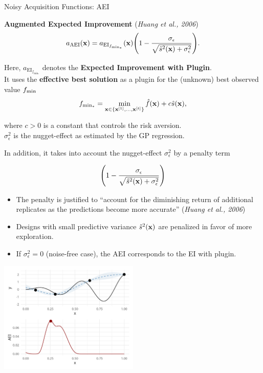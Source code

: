 \documentclass[11pt,compress,t,notes=noshow, xcolor=table]{beamer}
\begin{document}
\begin{vbframe}{Noisy Acquisition Functions: AEI}


\textbf{Augmented Expected Improvement} (\emph{Huang et al., 2006})
$$
  a_{\text{AEI}}(\mathbf{x}) = a_{\text{EI}_{f_{\min_*}}}(\mathbf{x}) \Bigg(1- \frac{\sigma_{\epsilon}}{\sqrt{\hat{s}^2(\mathbf{x})+ \sigma_{\epsilon}^{2}}}\Bigg).
$$

Here, $a_{\text{EI}_{f_{\min_*}}}$ denotes the \textbf{Expected Improvement with Plugin}.\\
It uses the \textbf{effective best solution} as a plugin for the (unknown) best observed value $f_{\min}$
$$
  f_{\min_*} = \min_{\mathbf{x} \in \{\mathbf{x}^{[1]}, ..., \mathbf{x}^{[t]}\}} \hat{f}(\mathbf{x}) + c \hat{s}(\mathbf{x}),
$$

where $c > 0$ is a constant that controls the risk aversion.\\
\vspace{1em}
$\sigma_{\epsilon}^{2}$ is the nugget-effect as estimated by the GP regression.


\framebreak

In addition, it takes into account the nugget-effect $\sigma_{\epsilon}^{2}$ by a penalty term

$$
  \Bigg(1- \frac{\sigma_\epsilon}{\sqrt{\hat{s}^2(\mathbf{x})+ \sigma_\epsilon^2}}\Bigg)
$$

\begin{itemize}
  \item The penalty is justified to \enquote{account for the diminishing return of additional replicates as the predictions become more accurate} (\emph{Huang et al., 2006})
  \item Designs with small predictive variance $\hat{s}^2(\mathbf{x})$ are penalized in favor of more exploration.
  \item If $\sigma_\epsilon^2 = 0$ (noise-free case), the AEI corresponds to the EI with plugin. 
\end{itemize}

\framebreak

\vspace*{1cm}

\begin{center}
  \includegraphics[width = 0.5\textwidth]{figure_man/noisy_3.png}
\end{center}


\end{vbframe}
\end{document}
